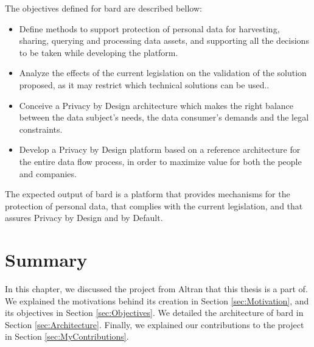 The objectives defined for \ac{bard} are described bellow:

\begin{itemize}
	
	\item Define methods to support protection of personal data for harvesting, sharing, querying and processing data assets, and supporting all the decisions to be taken while developing the platform.
	\item Analyze the effects of the current legislation on the validation of the solution proposed, as it may restrict which technical solutions can be used..
	\item Conceive a Privacy by Design architecture which makes the right balance between the data subject’s needs, the data consumer’s demands and the legal constraints.
	\item Develop a Privacy by Design platform based on a reference architecture for the entire data flow process, in order to maximize value for both the people and companies.
\end{itemize}

The expected output of \ac{bard} is a platform that provides mechanisms for the protection of personal data, that complies with the current legislation, and that assures Privacy by Design and by Default.





  
\section{Summary}
\label{sec:SummaryBARD}

In this chapter, we discussed the project from Altran that this thesis is a part of.
We explained the motivations behind its creation in Section \ref{sec:Motivation}, and its objectives in Section \ref{sec:Objectives}.
We detailed the architecture of \ac{bard} in Section \ref{sec:Architecture}.
Finally, we explained our contributions to the project in Section \ref{sec:MyContributions}.


